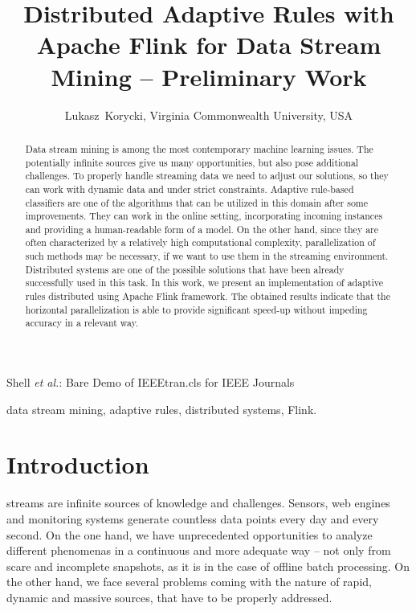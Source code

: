 \documentclass[journal]{IEEEtran}
\begin{document}
\title{Distributed Adaptive Rules with Apache Flink for Data Stream Mining -- Preliminary Work}

\author{Lukasz~Korycki, Virginia Commonwealth University, USA}%

%
{Shell \MakeLowercase{\textit{et al.}}: Bare Demo of IEEEtran.cls for IEEE Journals}

\maketitle

\begin{abstract}
	Data stream mining is among the most contemporary machine learning issues. The potentially infinite sources give us many opportunities, but also pose additional challenges. To properly handle streaming data we need to adjust our solutions, so they can work with dynamic data and under strict constraints. Adaptive rule-based classifiers are one of the algorithms that can be utilized in this domain after some improvements. They can work in the online setting, incorporating incoming instances and providing a human-readable form of a model. On the other hand, since they are often characterized by a relatively high computational complexity, parallelization of such methods may be necessary, if we want to use them in the streaming environment. Distributed systems are one of the possible solutions that have been already successfully used in this task. In this work, we present an implementation of adaptive rules distributed using Apache Flink framework. The obtained results indicate that the horizontal parallelization is able to provide significant speed-up without impeding accuracy in a relevant way.
\end{abstract}

\begin{IEEEkeywords}
	data stream mining, adaptive rules, distributed systems, Flink.
\end{IEEEkeywords}

\IEEEpeerreviewmaketitle

\section{Introduction}

 streams are infinite sources of knowledge and challenges. Sensors, web engines and monitoring systems generate countless data points every day and every second. On the one hand, we have unprecedented opportunities to analyze different phenomenas in a continuous and more adequate way -- not only from scare and incomplete snapshots, as it is in the case of offline batch processing. On the other hand, we face several problems coming with the nature of rapid, dynamic and massive sources, that have to be properly addressed. 
\end{document}
